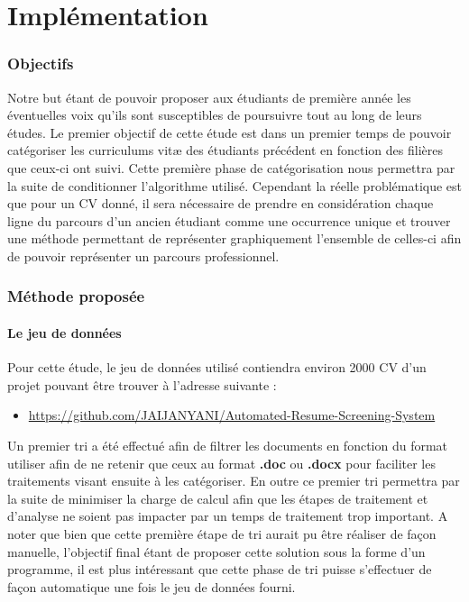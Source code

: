 \documentclass[memoire.tex]{subfiles}
\begin{document}
\chapter{Implémentation}

\subsection{Objectifs}

Notre but étant de pouvoir proposer aux étudiants de première année les éventuelles voix qu'ils sont susceptibles de poursuivre tout au long de leurs études. Le premier objectif de cette étude est dans un premier temps de pouvoir catégoriser les curriculums vitæ des étudiants précédent en fonction des filières que ceux-ci ont suivi. Cette première phase de catégorisation nous permettra par la suite de conditionner l'algorithme utilisé. Cependant la réelle problématique est que pour un CV donné, il sera nécessaire de prendre en considération chaque ligne du parcours d'un ancien étudiant comme une occurrence unique et trouver une méthode permettant de représenter graphiquement l'ensemble de celles-ci afin de pouvoir représenter un parcours professionnel.

\subsection{Méthode proposée}

\subsubsection{Le jeu de données}

Pour cette étude, le jeu de données utilisé contiendra environ 2000 CV  d'un projet pouvant être trouver à l'adresse suivante : \begin{itemize}
\item \url{https://github.com/JAIJANYANI/Automated-Resume-Screening-System}
\end{itemize}
Un premier tri a été effectué afin de filtrer les documents en fonction du format utiliser afin de ne retenir que ceux au format \textbf{.doc} ou \textbf{.docx} pour faciliter les traitements visant ensuite à les catégoriser. En outre ce premier tri permettra par la suite de minimiser la charge de calcul afin que les étapes de traitement et d'analyse ne soient pas impacter par un temps de traitement trop important. A noter que bien que cette première étape de tri aurait pu être réaliser de façon manuelle, l'objectif final étant de proposer cette solution sous la forme d'un programme, il est plus intéressant que cette phase de tri puisse s'effectuer de façon automatique une fois le jeu de données fourni.
\end{document}
